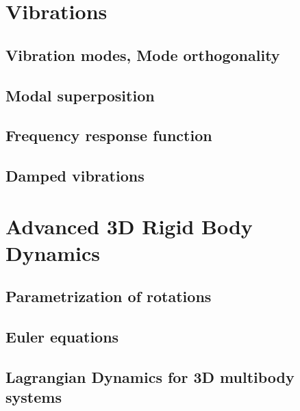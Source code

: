 \documentclass[10pt,a4paper]{scrartcl}
\begin{document}
\begin{multicols*}{2}
\section{Vibrations}
\subsection{Vibration modes, Mode orthogonality}
\subsection{Modal superposition}
\subsection{Frequency response function}
\subsection{Damped vibrations}
\section{Advanced 3D Rigid Body Dynamics}
\subsection{Parametrization of rotations}
\subsection{Euler equations}
\subsection{Lagrangian Dynamics for 3D multibody systems}
\end{multicols*}
\end{document}
